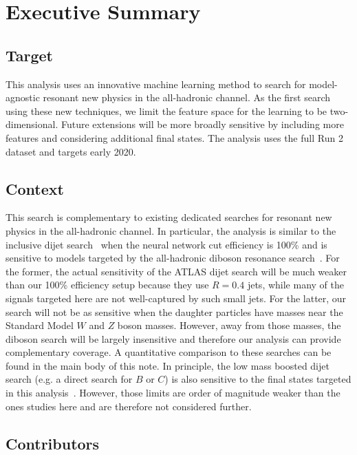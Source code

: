\section{Executive Summary}

\subsection{Target}

This analysis uses an innovative machine learning method to search for model-agnostic resonant new physics in the all-hadronic channel.   As the first search using these new techniques, we limit the feature space for the learning to be two-dimensional.  Future extensions will be more broadly sensitive by including more features and considering additional final states.  The analysis uses the full Run 2 dataset and targets early 2020.

\subsection{Context}

This search is complementary to existing dedicated searches for resonant new physics in the all-hadronic channel.  In particular, the analysis is similar to the inclusive dijet search~\cite{Aad:2019hjw} when the neural network cut efficiency is 100\% and is sensitive to models targeted by the all-hadronic diboson resonance search~\cite{Aad:2019fbh}.  For the former, the actual sensitivity of the ATLAS dijet search will be much weaker than our 100\% efficiency setup because they use $R = 0.4$ jets, while many of the signals targeted here are not well-captured by such small jets.  For the latter, our search will not be as sensitive when the daughter particles have masses near the Standard Model $W$ and $Z$ boson masses.  However, away from those masses, the diboson search will be largely insensitive and therefore our analysis can provide complementary coverage.  A quantitative comparison to these searches can be found in the main body of this note.  In principle, the low mass boosted dijet search (e.g. a direct search for $B$ or $C$) is also sensitive to the final states targeted in this analysis~\cite{EXOT-2017-01,EXOT-2016-20,Aaboud:2019zxd,CMS-EXO-16-030,CMS-EXO-17-001,Sirunyan:2018ikr}.  However, those limits are order of magnitude weaker than the ones studies here and are therefore not considered further.

\subsection{Contributors}


